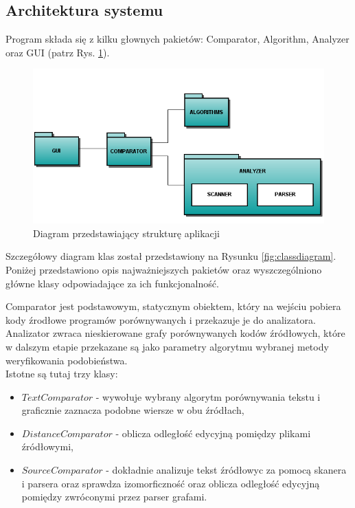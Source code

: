 \documentclass[a4paper,12pt,twoside]{article}
\begin{document}
\subsection{Architektura systemu}

Program składa się z kilku głownych pakietów: Comparator, Algorithm, Analyzer oraz GUI (patrz Rys. \ref{fig:gui}).

\begin{figure}[!h]
\centering
\includegraphics[scale=0.65]{gfx/packagediagram.png}
\caption{Diagram przedstawiający strukturę aplikacji}
\label{fig:gui}
\end{figure}

Szczegółowy diagram klas został przedstawiony na Rysunku \ref{fig:classdiagram}. Poniżej przedstawiono opis najważniejszych pakietów oraz wyszczególniono główne klasy odpowiadające za ich funkcjonalność.

Comparator jest podstawowym, statycznym obiektem, który na wejściu pobiera kody źrodłowe programów porównywanych i przekazuje je do analizatora. Analizator zwraca nieskierowane grafy porównywanych kodów źródłowych, które w dalszym etapie przekazane są jako parametry algorytmu wybranej metody weryfikowania podobieństwa.
\pagebreak
\\
Istotne są tutaj trzy klasy: 
\begin{itemize}
\item $TextComparator$ - wywołuje wybrany algorytm porównywania tekstu i graficznie zaznacza podobne wiersze w obu źródłach,
\item $DistanceComparator$ - oblicza odległość edycyjną pomiędzy plikami źródłowymi,
\item $SourceComparator$ - dokładnie analizuje tekst źródłowyc za pomocą skanera i parsera oraz sprawdza izomorficzność oraz oblicza odległość edycyjną pomiędzy zwróconymi przez parser grafami.
\end{itemize}
\end{document}
